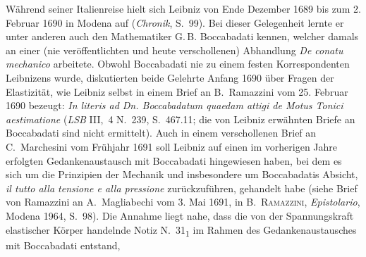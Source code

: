 %
%
%
%
%
\frenchspacing%
%
\footnotesize%
\pstart%
\noindent%
Während \label{LH_35_10_17_005-008_intro}%
seiner Italienreise\protect{}
hielt sich Leibniz von Ende Dezember 1689 bis zum 2. Februar 1690 in Modena\protect{} auf
(\cite{01236}\textit{Chronik}, S.~99).
Bei dieser Gelegenheit lernte er unter anderen auch den Mathematiker G.\,B. Boccabadati %
\protect{} kennen,
welcher damals an einer
(nie veröffentlichten und heute verschollenen)
Abhandlung \cite{01237}\textit{De conatu mechanico} arbeitete.
Obwohl Boccabadati nie zu einem festen Korrespondenten Leibnizens wurde,
diskutierten beide Gelehrte Anfang 1690 über Fragen der Elastizität,
wie Leibniz selbst in einem Brief an B.~Ramazzini vom 25. Februar 1690 bezeugt:
\textit{In literis ad Dn. Boccabadatum quaedam attigi de Motus Tonici aestimatione}
(\cite{01238}\textit{LSB} III,~4 N.~239, S.~467.11;
die von Leibniz erwähnten Briefe an Boccabadati sind nicht ermittelt).
Auch in einem verschollenen Brief an C.~Marchesini%
\protect{}
vom Frühjahr 1691 soll Leibniz auf einen im vorherigen Jahre erfolgten Gedankenaustausch mit Boccabadati hingewiesen haben,
bei dem es sich um die Prinzipien der Mechanik
und insbesondere um Boccabadatis Absicht,
\textit{il tutto alla tensione e alla pressione} zurückzuführen,
gehandelt habe
(siehe Brief von Ramazzini%
\protect{}
an A.~Magliabechi\protect{} vom 3. Mai 1691,
in \cite{01239}B.~\textsc{Ramazzini}, \textit{Epistolario}, Modena 1964, S.~98).
\newline%
\indent%
Die Annahme liegt nahe,
dass die von der Spannungskraft elastischer Körper handelnde Notiz N.~31\textsubscript{1}
im Rahmen des Gedankenaustausches mit Boccabadati entstand,
